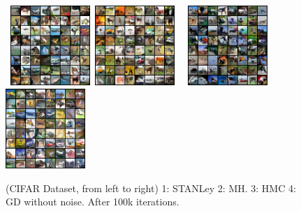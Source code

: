 \documentclass[10pt,twocolumn,letterpaper]{article}
\begin{document}
\begin{figure}[H]
\begin{center}
    \mbox{
        \includegraphics[width=1.19in]{figs/cifaranila}
        \includegraphics[width=1.19in]{figs/mh_x_q_099900}
        }\vspace{0.05in}
            \mbox{
                \includegraphics[width=1.19in]{figs/hmc_x_q_099900}
                        \includegraphics[width=1.19in]{figs/gd_x_q_099900}
        }
\end{center}
\caption{(CIFAR Dataset, from left to right) 1: STANLey 2: MH. 3: HMC 4: GD without noise. After 100k iterations.}
	\label{fig:cifarmore}
\end{figure}





% 
% 
\end{document}
